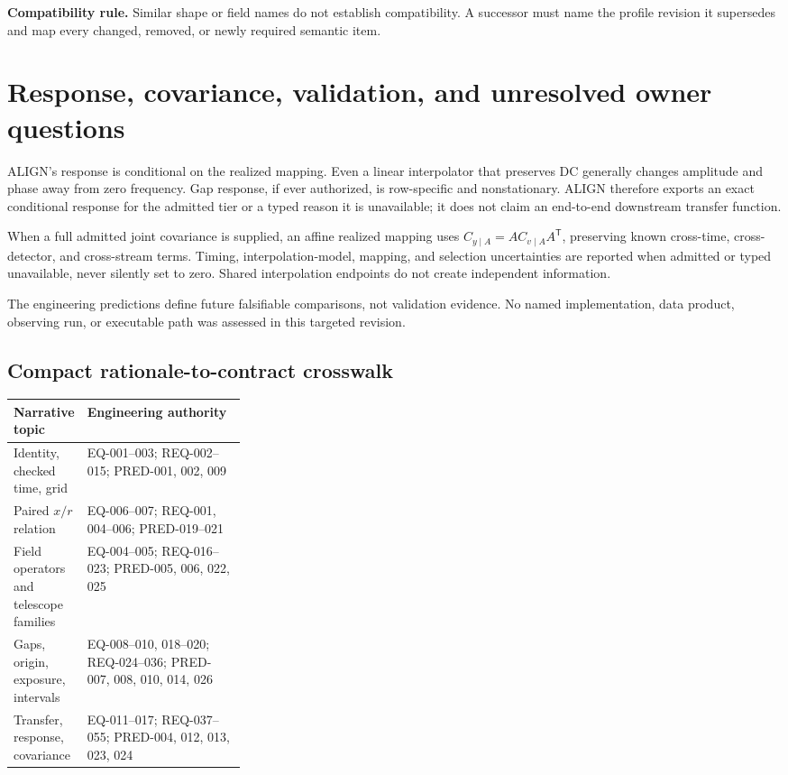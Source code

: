 \documentclass[10pt]{article}
\newcommand{\statusbox}[1]{\par\smallskip\noindent\colorbox{aligngray}{\parbox{0.96\linewidth}{#1}}\par\smallskip}
\begin{document}
\statusbox{\textbf{Compatibility rule.} Similar shape or field names do not
establish compatibility.  A successor must name the profile revision it
supersedes and map every changed, removed, or newly required semantic item.}

\clearpage
\section{Response, covariance, validation, and unresolved owner questions}

ALIGN's response is conditional on the realized mapping.  Even a linear
interpolator that preserves DC generally changes amplitude and phase away from
zero frequency.  Gap response, if ever authorized, is row-specific and
nonstationary.  ALIGN therefore exports an exact conditional response for the
admitted tier or a typed reason it is unavailable; it does not claim an
end-to-end downstream transfer function.

When a full admitted joint covariance is supplied, an affine realized mapping
uses \(C_{y\mid A}=A C_{v\mid A}A^{\mathsf T}\), preserving known cross-time,
cross-detector, and cross-stream terms.  Timing, interpolation-model, mapping,
and selection uncertainties are reported when admitted or typed unavailable,
never silently set to zero.  Shared interpolation endpoints do not create
independent information.

The engineering predictions define future falsifiable comparisons, not
validation evidence.  No named implementation, data product, observing run,
or executable path was assessed in this targeted revision.

\subsection*{Compact rationale-to-contract crosswalk}
\begin{center}
\small
\begin{tabularx}{0.95\linewidth}{@{}p{0.30\linewidth}Y@{}}
\toprule
Narrative topic & Engineering authority \\
\midrule
Identity, checked time, grid & EQ-001--003; REQ-002--015; PRED-001, 002, 009 \\
Paired \(x/r\) relation & EQ-006--007; REQ-001, 004--006; PRED-019--021 \\
Field operators and telescope families & EQ-004--005; REQ-016--023; PRED-005, 006, 022, 025 \\
Gaps, origin, exposure, intervals & EQ-008--010, 018--020; REQ-024--036; PRED-007, 008, 010, 014, 026 \\
Transfer, response, covariance & EQ-011--017; REQ-037--055; PRED-004, 012, 013, 023, 024 \\
\bottomrule
\end{tabularx}
\end{center}
\end{document}
